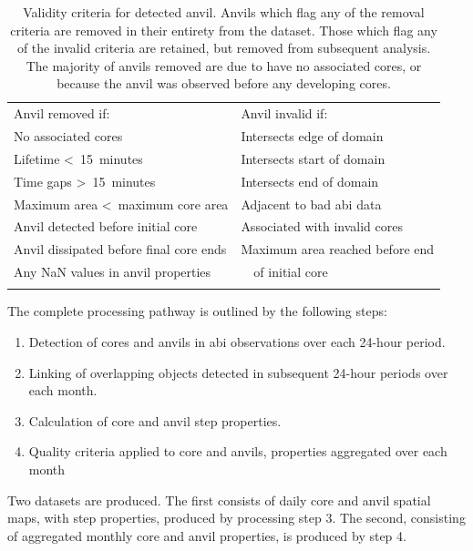\begin{table}[tb]
\centering
\begin{tabular}{ll}
\tophline
Anvil removed if:                               & Anvil invalid if: \\
\middlehline
No associated cores                             & Intersects edge of domain \\
Lifetime \textless~15~minutes                   & Intersects start of domain \\             
Time gaps \textgreater~15~minutes               & Intersects end of domain \\
Maximum area \textless~maximum core area        & Adjacent to bad \acrshort{abi} data \\
Anvil detected before initial core              & Associated with invalid cores \\
Anvil dissipated before final core ends         & Maximum area reached before end \\
Any NaN values in anvil properties              & ~~of initial core \\
\bottomhline
\end{tabular}
\caption[
Validity criteria for detected anvils
]{
Validity criteria for detected anvil. Anvils which flag any of the removal criteria are removed in their entirety from the dataset. Those which flag any of the invalid criteria are retained, but removed from subsequent analysis. The majority of anvils removed are due to have no associated cores, or because the anvil was observed before any developing cores.}
\label{table:anvil_validity_criteria}
\end{table}


The complete processing pathway is outlined by the following steps:

\begin{enumerate}
    \item Detection of cores and anvils in \acrshort{abi} observations over each 24-hour period.
    \item Linking of overlapping objects detected in subsequent 24-hour periods over each month.
    \item Calculation of core and anvil step properties. 
    \item Quality criteria applied to core and anvils, properties aggregated over each month
\end{enumerate}

Two datasets are produced. The first consists of daily core and anvil spatial maps, with step properties, produced by processing step 3. 
The second, consisting of aggregated monthly core and anvil properties, is produced by step 4.

